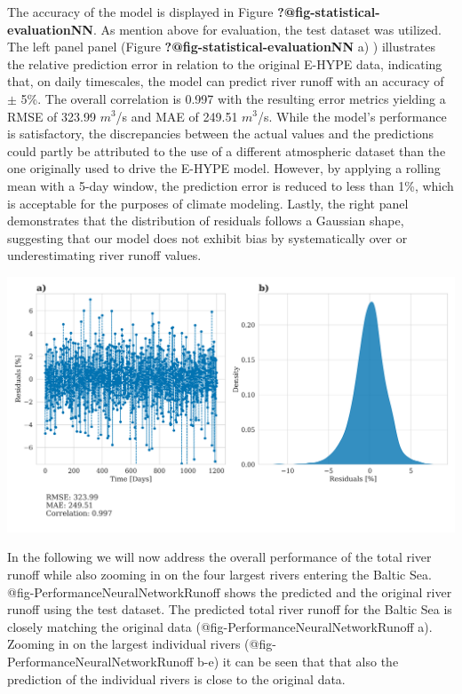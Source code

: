 \documentclass[
]{agujournal2019}
\begin{document}
The accuracy of the model is displayed in Figure
\textbf{?@fig-statistical-evaluationNN}. As mention above for
evaluation, the test dataset was utilized. The left panel panel (Figure
\textbf{?@fig-statistical-evaluationNN} a) ) illustrates the relative
prediction error in relation to the original E-HYPE data, indicating
that, on daily timescales, the model can predict river runoff with an
accuracy of \(\pm\) 5\%. The overall correlation is 0.997 with the
resulting error metrics yielding a RMSE of 323.99 \(m^3\)/s and MAE of
249.51 \(m^3\)/s. While the model's performance is satisfactory, the
discrepancies between the actual values and the predictions could partly
be attributed to the use of a different atmospheric dataset than the one
originally used to drive the E-HYPE model. However, by applying a
rolling mean with a 5-day window, the prediction error is reduced to
less than 1\%, which is acceptable for the purposes of climate modeling.
Lastly, the right panel demonstrates that the distribution of residuals
follows a Gaussian shape, suggesting that our model does not exhibit
bias by systematically over or underestimating river runoff values.

\includegraphics{../src/figures/paper_error_metrics.png}

In the following we will now address the overall performance of the
total river runoff while also zooming in on the four largest rivers
entering the Baltic Sea. @fig-PerformanceNeuralNetworkRunoff shows the
predicted and the original river runoff using the test dataset. The
predicted total river runoff for the Baltic Sea is closely matching the
original data (@fig-PerformanceNeuralNetworkRunoff a). Zooming in on the
largest individual rivers (@fig-PerformanceNeuralNetworkRunoff b-e) it
can be seen that that also the prediction of the individual rivers is
close to the original data.
\end{document}

